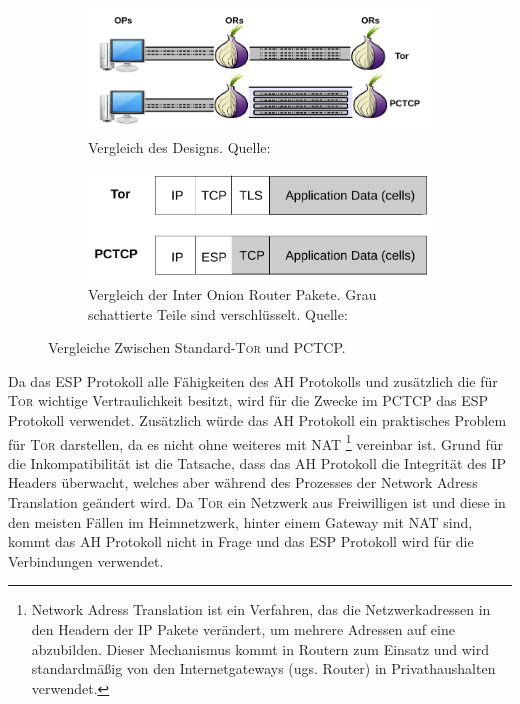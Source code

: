 \documentclass[fleqn,envcountsame,runningheads,10pt,a4paper]{llncs}
\begin{document}
\begin{figure}[h]
  \begin{center}
    \begin{subfigure}[t]{0.46\textwidth}
      \includegraphics[width=\textwidth]{pics/PCTCP_design.pdf}
      \caption{Vergleich des Designs. Quelle: \cite{pctcp}}
      \label{fig:pctcpdesign}
    \end{subfigure}
    \begin{subfigure}[t]{0.46\textwidth}
      \includegraphics[width=\textwidth]{pics/PCTCP_header.pdf}
      \caption{Vergleich der Inter Onion Router Pakete. Grau schattierte Teile sind verschlüsselt. Quelle:\cite{pctcp}}
      \label{fig:pctcpheader}
    \end{subfigure}
    \caption{Vergleiche Zwischen Standard-\textsc{Tor} und PCTCP.}
  \end{center} 
\end{figure}

Da das ESP Protokoll alle Fähigkeiten des AH Protokolls und zusätzlich die für \textsc{Tor} wichtige Vertraulichkeit besitzt, wird für die Zwecke im PCTCP das ESP Protokoll verwendet. Zusätzlich würde das AH Protokoll ein praktisches Problem für \textsc{Tor} darstellen, da es nicht ohne weiteres mit NAT \footnote{Network Adress Translation \cite{rfc:nat} ist ein Verfahren, das die Netzwerkadressen in den  Headern der IP Pakete verändert, um mehrere Adressen auf eine abzubilden. Dieser Mechanismus kommt in Routern zum Einsatz und wird standardmäßig von den Internetgateways (ugs. Router) in Privathaushalten verwendet.}  vereinbar ist. Grund für die Inkompatibilität ist die Tatsache, dass das AH Protokoll die Integrität des IP Headers überwacht, welches aber während des Prozesses der Network Adress Translation geändert wird. Da \textsc{Tor} ein Netzwerk aus Freiwilligen ist und diese in den meisten Fällen im Heimnetzwerk, hinter einem Gateway mit NAT sind, kommt das AH Protokoll nicht in Frage und das ESP Protokoll wird für die Verbindungen verwendet.
\end{document}
